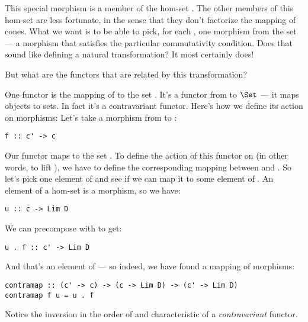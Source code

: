 This special morphism is a member of the hom-set .
The other members of this hom-set are less fortunate, in the sense that
they don't factorize the mapping of cones. What we want is to be able to
pick, for each , one morphism from the set
 --- a morphism that satisfies the particular
commutativity condition. Does that sound like defining a natural
transformation? It most certainly does!

But what are the functors that are related by this transformation?

One functor is the mapping of  to the set
. It's a functor from  to $\Set$ ---
it maps objects to sets. In fact it's a contravariant functor. Here's
how we define its action on morphisms: Let's take a morphism 
from  to :

\begin{Verbatim}[commandchars=\\\{\}]
f :: c' -> c
\end{Verbatim}
Our functor maps  to the set
. To define the action of this functor on
 (in other words, to lift ), we have to define the
corresponding mapping between  and
. So let's pick one element  of
 and see if we can map it to some element of
. An element of a hom-set is a morphism, so
we have:

\begin{Verbatim}[commandchars=\\\{\}]
u :: c -> Lim D
\end{Verbatim}
We can precompose  with  to get:

\begin{Verbatim}[commandchars=\\\{\}]
u . f :: c' -> Lim D
\end{Verbatim}
And that's an element of --- so indeed, we
have found a mapping of morphisms:

\begin{Verbatim}[commandchars=\\\{\}]
contramap :: (c' -> c) -> (c -> Lim D) -> (c' -> Lim D) 
contramap f u = u . f
\end{Verbatim}
Notice the inversion in the order of  and 
characteristic of a \emph{contravariant} functor.

\begin{figure}[H]
\centering
{}
\end{figure}

